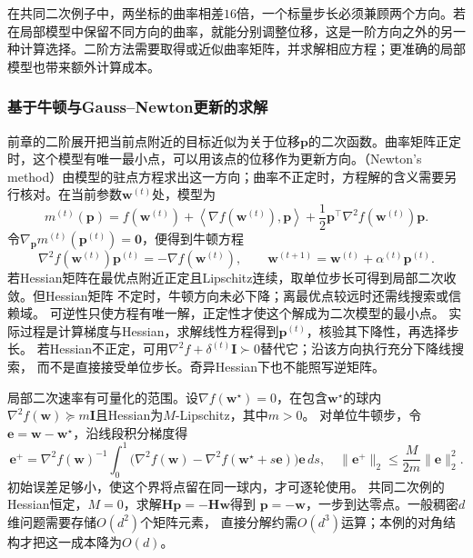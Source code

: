 在共同二次例子中，两坐标的曲率相差$16$倍，一个标量步长必须兼顾两个方向。若在局部模型中保留不同方向的曲率，就能分别调整位移，这是一阶方向之外的另一种计算选择。二阶方法需要取得或近似曲率矩阵，并求解相应方程；更准确的局部模型也带来额外计算成本。

\subsubsection{基于牛顿与Gauss–Newton更新的求解}
\label{sec:opt-newton-gauss-newton}

前章的二阶展开把当前点附近的目标近似为关于位移$\bm p$的二次函数。曲率矩阵正定时，这个模型有唯一最小点，可以用该点的位移作为更新方向。（Newton's method）由模型的驻点方程求出这一方向；曲率不正定时，方程解的含义需要另行核对。在当前参数$\bm w^{(t)}$处，模型为
\[
  m^{(t)}(\bm{p})
  =
  f(\bm{w}^{(t)})
  +\left\langle\nabla f(\bm{w}^{(t)}),\bm{p}\right\rangle
  +\frac12\bm{p}^{\top}\nabla^2f(\bm{w}^{(t)})\bm{p}.
\]
令$\nabla_{\bm{p}}m^{(t)}(\bm{p}^{(t)})=\bm{0}$，便得到牛顿方程
\[
  \nabla^2 f(\bm{w}^{(t)})\bm{p}^{(t)}
  =-\nabla f(\bm{w}^{(t)}),\qquad
  \bm{w}^{(t+1)}=\bm{w}^{(t)}+\alpha^{(t)}\bm{p}^{(t)}.
\]
若Hessian矩阵在最优点附近正定且Lipschitz连续，取单位步长可得到局部二次收敛。但Hessian矩阵
不定时，牛顿方向未必下降；离最优点较远时还需线搜索或信赖域。
可逆性只使方程有唯一解，正定性才使这个解成为二次模型的最小点。
实际过程是计算梯度与Hessian，求解线性方程得到$\bm p^{(t)}$，核验其下降性，再选择步长。
若Hessian不正定，可用$\nabla^2f+\delta^{(t)}\bm I\succ0$替代它；沿该方向执行充分下降线搜索，
而不是直接接受单位步长。奇异Hessian下也不能照写逆矩阵。

局部二次速率有可量化的范围。设$\nabla f(\bm w^\star)=0$，在包含$\bm w^\star$的球内
$\nabla^2f(\bm w)\succeq m\bm I$且Hessian为$M$-Lipschitz，其中$m>0$。
对单位牛顿步，令$\bm e=\bm w-\bm w^\star$，沿线段积分梯度得
\[
 \bm e^+
 =\nabla^2f(\bm w)^{-1}\!
 \int_0^1\bigl(\nabla^2f(\bm w)-\nabla^2f(\bm w^\star+s\bm e)\bigr)\bm e\,ds,
 \quad
 \|\bm e^+\|_2\leq\frac{M}{2m}\|\bm e\|_2^2.
\]
初始误差足够小，使这个界将点留在同一球内，才可逐轮使用。
共同二次例的Hessian恒定，$M=0$，求解$\bm H\bm p=-\bm H\bm w$得到
$\bm p=-\bm w$，一步到达零点。一般稠密$d$维问题需要存储$O(d^2)$个矩阵元素，
直接分解约需$O(d^3)$运算；本例的对角结构才把这一成本降为$O(d)$。


